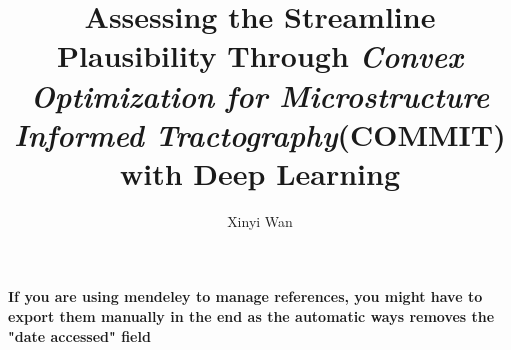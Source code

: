 \documentclass[12pt, openany]{book}
\title{Assessing the Streamline Plausibility Through \textit{Convex Optimization for Microstructure Informed Tractography}(COMMIT) with Deep Learning}
\author{Xinyi Wan}
\begin{document}







% 

% 





% 

\newpage
{}
\textbf{If you are using mendeley to manage references, you might have to export them manually in the end as the automatic ways removes the "date accessed" field}
\printbibliography





\end{document}
